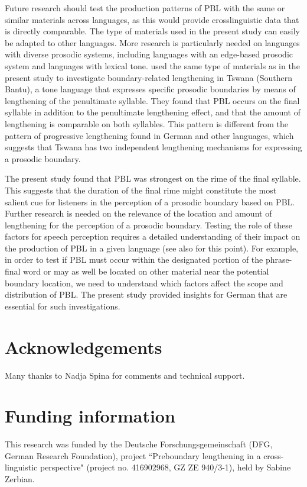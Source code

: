 \documentclass[output=paper]{langscibook}
\begin{document}
Future research should test the production patterns of PBL with the same or similar materials across languages, as this would provide crosslinguistic data that is directly comparable. The type of materials used in the present study can easily be adapted to other languages. More research is particularly needed on languages with diverse prosodic systems, including languages with an edge-based prosodic system and languages with lexical tone. \citet{SchuboeEtal2021} used the same type of materials as in the present study to investigate boundary-related lengthening in Tswana (Southern Bantu), a tone language that expresses specific prosodic boundaries by means of lengthening of the penultimate syllable. They found that PBL occurs on the final syllable in addition to the penultimate lengthening effect, and that the amount of lengthening is comparable on both syllables. This pattern is different from the pattern of progressive lengthening found in German and other languages, which suggests that Tswana has two independent lengthening mechanisms for expressing a prosodic boundary.

The present study found that PBL was strongest on the rime of the final syllable. This suggests that the duration of the final rime might constitute the most salient cue for listeners in the perception of a prosodic boundary based on PBL. Further research is needed on the relevance of the location and amount of lengthening for the perception of a prosodic boundary. Testing the role of these factors for speech perception requires a detailed understanding of their impact on the production of PBL in a given language (see also \citealt{TurkShattuck-Hufnagel2007} for this point). For example, in order to test if PBL must occur within the designated portion of the phrase-final word or may as well be located on other material near the potential boundary location, we need to understand which factors affect the scope and distribution of PBL. The present study provided insights for German that are essential for such investigations.


\section*{Acknowledgements}
Many thanks to Nadja Spina for comments and technical support.

\section*{Funding information}
This research was funded by the Deutsche Forschungsgemeinschaft (DFG, German Research Foundation), project ``Preboundary lengthening in a cross-lin\-guis\-tic perspective" (project no. 416902968, GZ ZE 940/3-1), held by Sabine Zerbian. 
\end{document}
